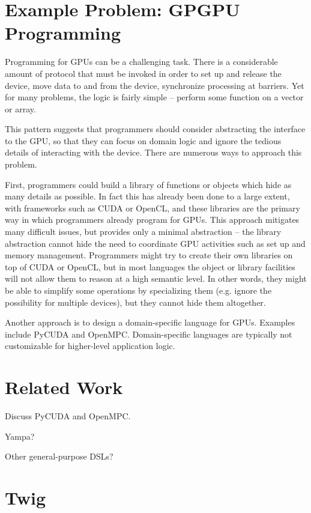 \documentclass[11pt]{article}
\begin{document}
\section{Example Problem: GPGPU Programming}

Programming for GPUs can be a challenging task. There is a considerable amount
of protocol that must be invoked in order to set up and release the device,
move data to and from the device, synchronize processing at barriers. Yet for
many problems, the logic is fairly simple -- perform some function on a vector
or array.

This pattern suggests that programmers should consider abstracting the
interface to the GPU, so that they can focus on domain logic and ignore the
tedious details of interacting with the device. There are numerous ways to
approach this problem.

First, programmers could build a library of functions or objects which hide as
many details as possible. In fact this has already been done to a large
extent, with frameworks such as CUDA or OpenCL, and these libraries are the
primary way in which programmers already program for GPUs. This approach
mitigates many difficult issues, but provides only a minimal abstraction --
the library abstraction cannot hide the need to coordinate GPU activities such
as set up and memory management. Programmers might try to create their own
libraries on top of CUDA or OpenCL, but in most languages the object or
library facilities will not allow them to reason at a high semantic level. In
other words, they might be able to simplify some operations by specializing
them (e.g. ignore the possibility for multiple devices), but they cannot hide
them altogether.

Another approach is to design a domain-specific language for GPUs. Examples
include PyCUDA and OpenMPC. Domain-specific languages are typically not
customizable for higher-level application logic.

\section{Related Work}

Discuss PyCUDA and OpenMPC. 

Yampa?

Other general-purpose DSLs?

\section{Twig}
\end{document}

